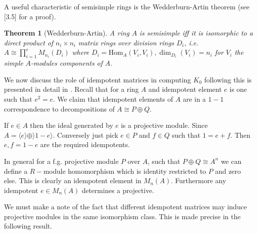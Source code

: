 \documentclass[12pt]{article}
\numberwithin{equation}{section}
\newcommand{\Hom}{{\mathrm{Hom}}}
\newcounter{dummy} \numberwithin{dummy}{section}
\newtheorem{theorem}[dummy]{Theorem}
\begin{document}
	A useful characteristic of semisimple rings is the Wedderburn-Artin theorem (see \cite{lam2001first}[3.5] for a proof).

	\begin{theorem}[Wedderburn-Artin]
		A ring $A$ is semisimple iff it is isomorphic to a direct product of $n_i \times n_i$ matrix rings over division rings $D_i$, i.e. $A \cong \prod_{i=1}^r M_{n_i}(D_i)$ where $D_i =\Hom_A(V_i,V_i), \dim_{D_i}(V_i)=n_i$ for $V_i$ the simple $A$-modules components of $A$.
	\end{theorem}
	
	We now discuss the role of idempotent matrices in computing $K_0$ following \cite{weibel2013k} this is presented in detail in \cite{rosenberg1995algebraic}.
	Recall that for a ring $A$ and idempotent element $e$ is one such that $e^2=e.$  We claim that idempotent elements of $A$ are in a $1-1$ correspondence to decompositions of $A \cong P \oplus Q$. 
	
	If $e \in A$ then the ideal generated by $e$ is a projective module. Since $A = \langle e \rangle \oplus \rangle 1-e \rangle$. Conversely just pick $e \in P$ and $f \in Q$ such that $1=e+f$. Then $e, f=1-e$ are the required idempotents. 
	
	In general for a f.g. projective module $P$ over $A$, such that $P \oplus Q \cong A^n$ we can define a $R-$module homomorphism which is identity restricted to $P$ and zero else. This is clearly an idempotent element in $M_n(A)$. Furthermore any idempotent $e \in M_n(A)$ determines a projective.
	
	We must make a note of the fact that different idempotent matrices may induce projective modules in the same isomorphism class. This is made precise in the following result.
	
\end{document}
